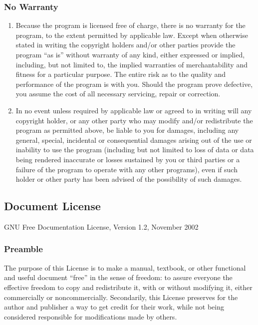 \documentclass{article}
\begin{document}
\subsubsection{No Warranty}

\begin{enumerate}
\item
Because the program is licensed free of charge, there is no warranty
for the program, to the extent permitted by applicable law.  Except when
otherwise stated in writing the copyright holders and/or other parties
provide the program ``as is'' without warranty of any kind, either expressed
or implied, including, but not limited to, the implied warranties of
merchantability and fitness for a particular purpose.  The entire risk as
to the quality and performance of the program is with you.  Should the
program prove defective, you assume the cost of all necessary servicing,
repair or correction.

\item
In no event unless required by applicable law or agreed to in writing
will any copyright holder, or any other party who may modify and/or
redistribute the program as permitted above, be liable to you for damages,
including any general, special, incidental or consequential damages arising
out of the use or inability to use the program (including but not limited
to loss of data or data being rendered inaccurate or losses sustained by
you or third parties or a failure of the program to operate with any other
programs), even if such holder or other party has been advised of the
possibility of such damages.
\end{enumerate}

\subsection{Document License}
\begin{center}
    GNU Free Documentation License, Version 1.2, November 2002
\end{center}
\subsubsection{Preamble}

The purpose of this License is to make a manual, textbook, or other
functional and useful document ``free'' in the sense of freedom: to
assure everyone the effective freedom to copy and redistribute it,
with or without modifying it, either commercially or noncommercially.
Secondarily, this License preserves for the author and publisher a way
to get credit for their work, while not being considered responsible
for modifications made by others.
\end{document}
